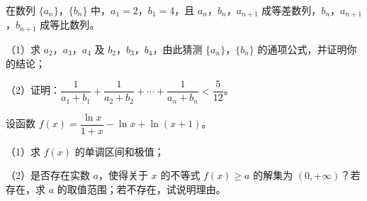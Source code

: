 \begin{question}
在数列 $\{a_n\}$，$\{b_n\}$ 中，$a_1=2$，$b_1=4$，且 $a_n$，$b_n$，$a_{n+1}$ 成等差数列，$b_n$，$a_{n+1}$，$b_{n+1}$ 成等比数列。

（1）求 $a_2$，$a_3$，$a_4$ 及 $b_2$，$b_3$，$b_4$，由此猜测 $\{a_n\}$，$\{b_n\}$ 的通项公式，并证明你的结论；

（2）证明：$\dfrac1{a_1+b_1}+\dfrac1{a_2+b_2}+\cdots+\dfrac1{a_n+b_n}<\dfrac5{12}$。

\end{question}
\begin{question}
设函数 $f(x)=\dfrac{\ln x}{1+x}-\ln x+\ln(x+1)$。

（1）求 $f(x)$ 的单调区间和极值；

（2）是否存在实数 $a$，使得关于 $x$ 的不等式 $f(x)\geqslant a$ 的解集为 $(0,+\infty)$？若存在，求 $a$ 的取值范围；若不存在，试说明理由。

\end{question}